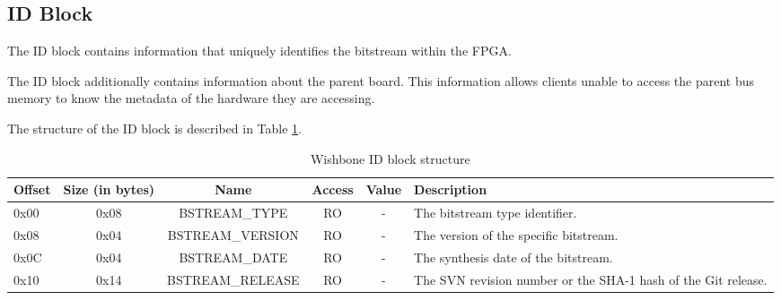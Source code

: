 \documentclass{article}
\begin{document}
\subsection{ID Block}\label{id_block}

The ID block contains information that uniquely identifies the bitstream
within the FPGA.

The ID block additionally contains information about the parent board.
This information allows clients unable to access the parent bus memory
to know the metadata of the hardware they are accessing.

The structure of the ID block is described in Table \ref{id_block_struct}.

\begin{center}
	\begin{savenotes}
	\begin{table}[!ht]\footnotesize
	\caption{Wishbone ID block structure}\label{id_block_struct}\centering
	\begin{tabular}{| l | c | c | c | c | p{5cm} |} \hline
	Offset & Size (in bytes) & Name & Access & Value & Description \\ \hline
	0x00 & 0x08 & BSTREAM\_TYPE & RO & - & The bitstream type identifier. \\ \hline
	0x08 & 0x04 & BSTREAM\_VERSION & RO & - & The version of the specific bitstream. \\ \hline
	0x0C & 0x04 & BSTREAM\_DATE & RO & - & The synthesis date of the bitstream. \\ \hline
	0x10 & 0x14 & BSTREAM\_RELEASE & RO & - & The SVN revision number or the SHA-1 hash of the Git release. \\ \hline
	\end{tabular}
	\end{table}
	\end{savenotes}
\end{center}
\end{document}
